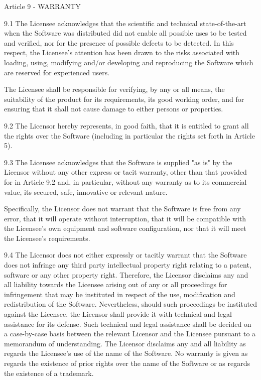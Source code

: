 \documentclass[oneside,english,onecolumn,letterpaper]{book}
\begin{document}
Article 9 - WARRANTY

9.1 The Licensee acknowledges that the scientific and technical state-of-the-art when the Software was distributed did not enable all possible uses to be tested and verified, nor for the presence of possible defects to be detected. In this respect, the Licensee's attention has been drawn to the risks associated with loading, using, modifying and/or developing and reproducing the Software which are reserved for experienced users.

The Licensee shall be responsible for verifying, by any or all means, the suitability of the product for its requirements, its good working order, and for ensuring that it shall not cause damage to either persons or properties.

9.2 The Licensor hereby represents, in good faith, that it is entitled to grant all the rights over the Software (including in particular the rights set forth in Article 5).

9.3 The Licensee acknowledges that the Software is supplied "as is" by the Licensor without any other express or tacit warranty, other than that provided for in Article 9.2 and, in particular, without any warranty as to its commercial value, its secured, safe, innovative or relevant nature.

Specifically, the Licensor does not warrant that the Software is free from any error, that it will operate without interruption, that it will be compatible with the Licensee's own equipment and software configuration, nor that it will meet the Licensee's requirements.

9.4 The Licensor does not either expressly or tacitly warrant that the Software does not infringe any third party intellectual property right relating to a patent, software or any other property right. Therefore, the Licensor disclaims any and all liability towards the Licensee arising out of any or all proceedings for infringement that may be instituted in respect of the use, modification and redistribution of the Software. Nevertheless, should such proceedings be instituted against the Licensee, the Licensor shall provide it with technical and legal assistance for its defense. Such technical and legal assistance shall be decided on a case-by-case basis between the relevant Licensor and the Licensee pursuant to a memorandum of understanding. The Licensor disclaims any and all liability as regards the Licensee's use of the name of the Software. No warranty is given as regards the existence of prior rights over the name of the Software or as regards the existence of a trademark.
\end{document}
